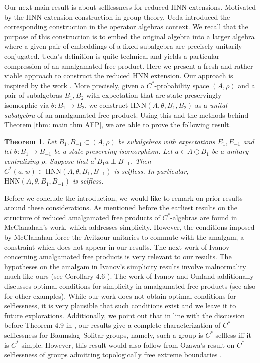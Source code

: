 \documentclass{amsart}
\newtheorem{theorem}{Theorem}[section]
\theoremstyle{definition}
\begin{document}
Our next main result is about selflessness for reduced HNN extensions. Motivated by the HNN extension construction in group theory, Ueda introduced the corresponding construction in the operator algebras context. We recall that the purpose of this construction is to embed the original algebra into a larger algebra where a given pair of embeddings of a fixed subalgebra are precisely unitarily conjugated. Ueda's definition is quite technical and yields a particular compression of an amalgamated free product. Here we present a fresh and rather viable approach to construct the reduced HNN extension. Our approach is inspired by the work \cite{gao2025conjugacy}. More precisely, given a $C^*$-probability space $(A, \rho)$ and a pair of subalgebras $B_1,B_2$ with expectation that are state-preservingly isomorphic via $\theta:B_1\to B_2$, we construct $\mathrm{HNN}(A,\theta, B_1,B_2)$ as a \emph{unital subalgebra} of an amalgamated free product. Using this and the methods behind Theorem \ref{thm: main thm AFP}, we are able to prove the following result.

\begin{theorem}
    Let $B_1,B_{-1}\subset (A,\rho)$ be subalgebras with expectations $E_1,E_{-1}$ and let $\theta:B_1\to B_{-1}$ be a state-preserving isomorphism. Let $a\in A\ominus B_1$ be a unitary centralizing $\rho.$ Suppose that $a^*B_1a\perp B_{-1}$. Then $C^\ast(a, w) \subset \mathrm{HNN}(A,\theta,B_1,B_{-1})$ is selfless. In particular, $\mathrm{HNN}(A,\theta,B_1,B_{-1})$ is selfless.
\end{theorem}

Before we conclude the introduction, we would like to remark on prior results around these considerations. As mentioned before the earliest results on the structure of reduced amalgamated free products of $C^*$-algebras are found in McClanahan's work, which addresses simplicity. However, the conditions imposed by McClanahan force the Avitzour unitaries to commute with the amalgam, a constraint which does not appear in our results. The next work of Ivanov \cite{ivanov2007structurereducedamalgamatedfree} concerning amalgamated free products is very relevant to our results. The hypotheses on the amalgam in Ivanov's simplicity results involve malnormality much like ours (see Corollary 4.6 \cite{ivanov2007structurereducedamalgamatedfree}). The work of Ivanov and Omland additionally discusses optimal conditions for simplicity in amalgamated free products \cite{IvanovOmland2017} (see also \cite{Bryder_Ivanov_Omland_2020} for other examples). While our work does not obtain optimal conditions for selflessness, it is very plausible that such conditions exist and we leave it to future explorations. Additionally, we point out that in line with the discussion before Theorem 4.9 in \cite{ivanov2007structurereducedamalgamatedfree}, our results give a complete characterization of $C^*$-selflessness for Baumslag--Solitar groups, namely, such a group is $C^*$-selfless iff it is $C^*$-simple. However, this result would also follow from Ozawa's result on $C^*$-selflessness of groups admitting topologically free extreme boundaries \cite{ozawa2025proximalityselflessnessgroupcalgebras}.
\end{document}

